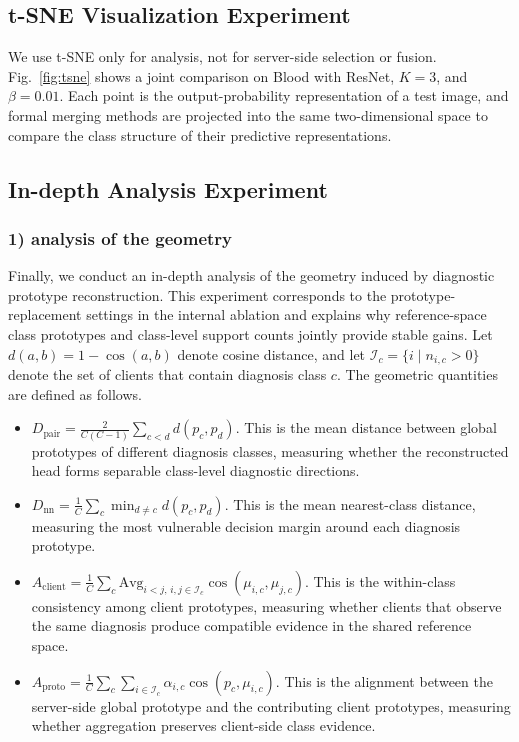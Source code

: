 \documentclass[letterpaper]{article} %
\begin{document}
\subsection{t-SNE Visualization Experiment}
We use t-SNE only for analysis, not for server-side selection or fusion. Fig.~\ref{fig:tsne} shows a joint comparison on Blood with ResNet, $K=3$, and $\beta=0.01$. Each point is the output-probability representation of a test image, and formal merging methods are projected into the same two-dimensional space to compare the class structure of their predictive representations.

\subsection{In-depth Analysis Experiment}
\subsubsection{1) analysis of the geometry}
Finally, we conduct an in-depth analysis of the geometry induced by diagnostic prototype reconstruction. This experiment corresponds to the prototype-replacement settings in the internal ablation and explains why reference-space class prototypes and class-level support counts jointly provide stable gains. Let \(d(a,b)=1-\cos(a,b)\) denote cosine distance, and let \(\mathcal{I}_c=\{i\mid n_{i,c}>0\}\) denote the set of clients that contain diagnosis class \(c\). The geometric quantities are defined as follows.

\begin{itemize}
\item \(D_{\mathrm{pair}}=\frac{2}{C(C-1)}\sum_{c<d}d(p_c,p_d)\). This is the mean distance between global prototypes of different diagnosis classes, measuring whether the reconstructed head forms separable class-level diagnostic directions.
\item \(D_{\mathrm{nn}}=\frac{1}{C}\sum_c \min_{d\ne c} d(p_c,p_d)\). This is the mean nearest-class distance, measuring the most vulnerable decision margin around each diagnosis prototype.
\item \(A_{\mathrm{client}}=\frac{1}{C}\sum_c \mathrm{Avg}_{i<j,\,i,j\in\mathcal{I}_c}\cos(\mu_{i,c},\mu_{j,c})\). This is the within-class consistency among client prototypes, measuring whether clients that observe the same diagnosis produce compatible evidence in the shared reference space.
\item \(A_{\mathrm{proto}}=\frac{1}{C}\sum_c\sum_{i\in\mathcal{I}_c}\alpha_{i,c}\cos(p_c,\mu_{i,c})\). This is the alignment between the server-side global prototype and the contributing client prototypes, measuring whether aggregation preserves client-side class evidence.
\end{itemize}
\end{document}
